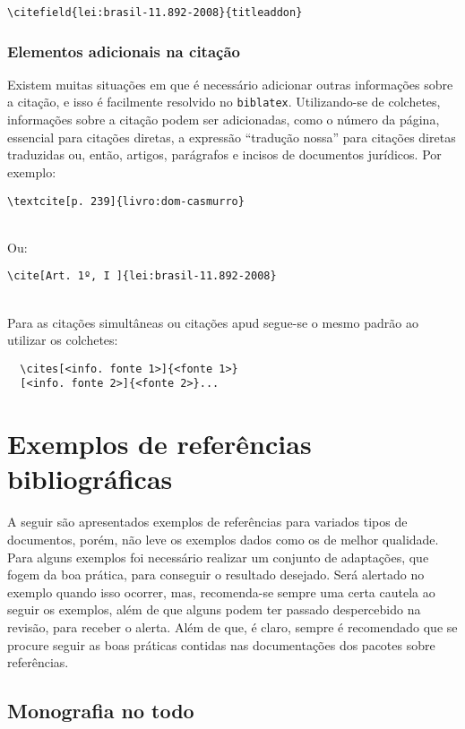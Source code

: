 \verb|\citefield{lei:brasil-11.892-2008}{titleaddon}|


\subsubsection{Elementos adicionais na citação}
Existem muitas situações em que é necessário adicionar outras informações sobre a citação, e isso é facilmente resolvido no \verb|biblatex|. Utilizando-se de colchetes, informações sobre a citação podem ser adicionadas, como o número da página, essencial para citações diretas, a expressão ``tradução nossa'' para citações diretas traduzidas ou, então, artigos, parágrafos e incisos de documentos jurídicos. Por exemplo:

\verb|\textcite[p. 239]{livro:dom-casmurro}|

\textcite[p. 239]{livro:dom-casmurro}\\

Ou:

\verb|\cite[Art. 1º, I ]{lei:brasil-11.892-2008}|

\cite[Art. 1º, I ]{lei:brasil-11.892-2008}\\

Para as citações simultâneas ou citações apud segue-se o mesmo padrão ao utilizar os colchetes: %
\begin{verbatim}
  \cites[<info. fonte 1>]{<fonte 1>}
  [<info. fonte 2>]{<fonte 2>}...
\end{verbatim}

\section{Exemplos de referências bibliográficas}
A seguir são apresentados exemplos de referências para variados tipos de documentos, porém, não leve os exemplos dados como os de melhor qualidade. Para alguns exemplos foi necessário realizar um conjunto de adaptações, que fogem da boa prática, para conseguir o resultado desejado. Será alertado no exemplo quando isso ocorrer, mas, recomenda-se sempre uma certa cautela ao seguir os exemplos, além de que alguns podem ter passado despercebido na revisão, para receber o alerta. Além de que, é claro, sempre é recomendado que se procure seguir as boas práticas contidas nas documentações dos pacotes sobre referências.

\subsection{Monografia no todo} %

